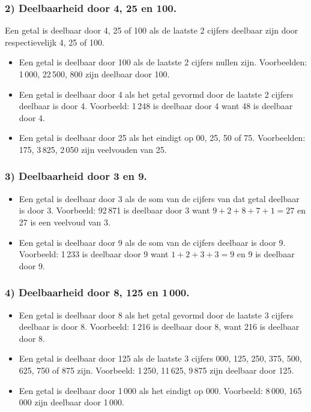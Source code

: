 \documentclass{bis}
\begin{document}
\subsubsection*{2) Deelbaarheid door 4, 25 en 100.}
Een getal is deelbaar door 4, 25 of 100 als de laatste 2 cijfers deelbaar zijn door
respectievelijk 4, 25 of 100.
\begin{itemize}
  \item Een getal is deelbaar door 100 als de laatste 2 cijfers nullen zijn. Voorbeelden:
  1\,000, 22\,500, 800 zijn deelbaar door 100.
  \item Een getal is deelbaar door 4 als het getal gevormd door de laatste 2 cijfers deelbaar is
  door 4. Voorbeeld: 1\,248 is deelbaar door 4 want 48 is deelbaar door 4.
  \item Een getal is deelbaar door 25 als het eindigt op 00, 25, 50 of 75. Voorbeelden: 175,
  3\,825, 2\,050 zijn veelvouden van 25.
\end{itemize}

\subsubsection*{3) Deelbaarheid door 3 en 9.}
\begin{itemize}
  \item Een getal is deelbaar door 3 als de som van de cijfers van dat getal deelbaar is door 3.
  Voorbeeld: 92\,871 is deelbaar door 3 want $9+2+8+7+1=27$ en 27 is een veelvoud van 3.
  \item Een getal is deelbaar door 9 als de som van de cijfers deelbaar is door 9. Voorbeeld:
  1\,233 is deelbaar door 9 want $1+2+3+3=9$ en 9 is deelbaar door 9.
\end{itemize}

\subsubsection*{4) Deelbaarheid door 8, 125 en 1\,000.}
\begin{itemize}
  \item Een getal is deelbaar door 8 als het getal gevormd door de laatste 3 cijfers deelbaar is
  door 8. Voorbeeld: 1\,216 is deelbaar door 8, want 216 is deelbaar door 8.
  \item Een getal is deelbaar door 125 als de laatste 3 cijfers 000, 125, 250, 375, 500, 625,
  750 of 875 zijn. Voorbeeld: 1\,250, 11\,625, 9\,875 zijn deelbaar door 125.
  \item Een getal is deelbaar door 1\,000 als het eindigt op 000. Voorbeeld: 8\,000, 165\,000
  zijn deelbaar door 1\,000.
\end{itemize}
\end{document}
